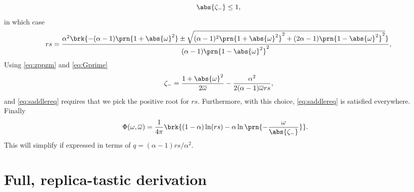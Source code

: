 \documentclass[12pt]{article}
\newcommand{\omb}{\overline{\omega}}
\newcommand{\opo}{\prn{1+\abs{\omega}^2}}
\newcommand{\omo}{\prn{1-\abs{\omega}^2}}
\begin{document}
%
\begin{equation}\label{eq:saddlereq}
  \abs{\zeta_-}\leq1,
\end{equation}
%
in which case
%
\begin{equation}\label{eq:saddlesolrs}
\begin{aligned}
  rs &= \frac{\alpha^2 \brk{ -(\alpha-1)\opo \pm \sqrt{ (\alpha-1)^2\opo^2 + (2\alpha-1)\omo^2 } }}{(\alpha-1)\omo^2},\\
\end{aligned}
\end{equation}
%
Using \eqref{eq:zppzm} and \eqref{eq:Gprime}
%
\begin{equation}\label{eq:saddlesolzm}
\begin{aligned}
  \zeta_- &= \frac{1+\abs{\omega}^2}{2\omb} - \frac{\alpha^2}{2(\alpha-1)\omb rs},\\
\end{aligned}
\end{equation}
%
and \eqref{eq:saddlereq} requires that we pick the positive root for $rs$.
Furthermore, with this choice, \eqref{eq:saddlereq} is satisfied everywhere.
Finally
%
\begin{equation}\label{eq:saddlesol}
\begin{aligned}
 \Phi(\omega,\omb) &= \frac{1}{4\pi}\brk{ (1-\alpha)\ln(rs) -\alpha\ln\prn{-\frac{\omega}{\abs{\zeta_-}}}}.
\end{aligned}
\end{equation}
%
This will simplify if expressed in terms of $q=(\alpha-1)rs/\alpha^2$.




\section{Full, replica-tastic derivation}\label{sec:replicader}
\end{document}
